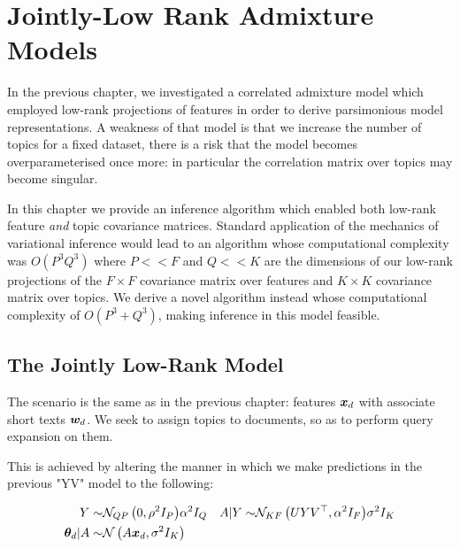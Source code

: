 \newcommand \Ed {{ \vv{\xi}_d}}
\newcommand \Edj {{\xi_{dj}}}
\newcommand \Edk {{\xi_{dk}}}
\newcommand \AEdj {{\Lambda(\xi_{dj})}}
\newcommand \AEdk {{\Lambda(\xi_{dk})}}
\newcommand \AEd  {{ \bm{\Lambda}(\bm{\xi}_d) }}

\newcommand \Axi { { \Lambda_{\xi} } }
\newcommand \bxi { { \vv{b}_{\xi} } }
\newcommand \cxi { { c_{\xi} } }

\chapter{Jointly-Low Rank Admixture Models}
In the previous chapter, we investigated a correlated admixture model which employed low-rank projections of features in order to derive parsimonious model representations. A weakness of that model is that we increase the number of topics for a fixed dataset, there is a risk that the model becomes overparameterised once more: in particular the correlation matrix over topics may become singular.

In this chapter we provide an inference algorithm which enabled both low-rank feature \emph{and} topic covariance matrices. Standard application of the mechanics of variational inference would lead to an algorithm whose computational complexity was $O(P^3Q^3)$ where $P << F$ and $Q << K$ are the dimensions of our low-rank projections of the $F\times F$ covariance matrix over features and $K \times K$ covariance matrix over topics. We derive a novel algorithm instead whose computational complexity of $O(P^3 + Q^3)$, making inference in this model feasible.

\section{The Jointly Low-Rank Model}

The scenario is the same as in the previous chapter: features $\bm x_d$ with associate short texts ${ \bm w_d }$. We seek to assign topics to documents, so as to perform query expansion on them.

This is achieved by altering the manner in which we make predictions in the previous "YV" model to the following:

\begin{align}
Y \sim & { \mathcal{N}_{QP}\left({0},{\rho^2 I_P}\right) }{\alpha^2 I_Q} & A|Y \sim & { \mathcal{N}_{KF}\left({UYV^\top},{\alpha^2 I_F}\right) }{\sigma^2 I_K} \\
{ \bm \theta_d } | A \sim & \mathcal{N} \left( {A\bm x_d}, {\sigma^2 I_K} \right)
\end{align}

